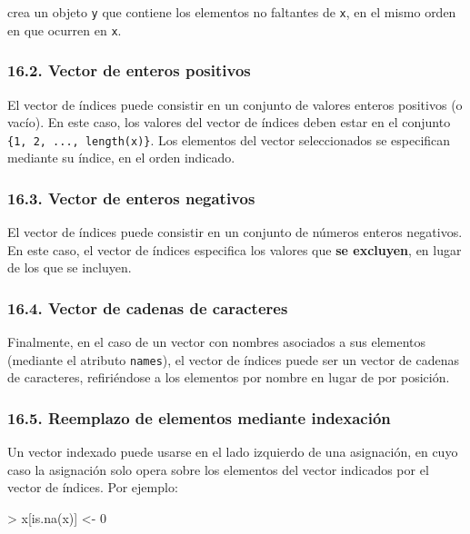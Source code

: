 \documentclass[
  jou,
  floatsintext,
  longtable,
  a4paper,
  nolmodern,
  notxfonts,
  notimes,
  12pt,
  colorlinks=true,linkcolor=blue,citecolor=blue,urlcolor=blue]{apa7}
\newenvironment{Shaded}{\begin{snugshade}}{\end{snugshade}}
\newcommand{\DecValTok}[1]{\textcolor[rgb]{0.68,0.00,0.00}{#1}}
\newcommand{\FunctionTok}[1]{\textcolor[rgb]{0.28,0.35,0.67}{#1}}
\newcommand{\NormalTok}[1]{\textcolor[rgb]{0.00,0.23,0.31}{#1}}
\newcommand{\OtherTok}[1]{\textcolor[rgb]{0.00,0.23,0.31}{#1}}
\newcommand{\SpecialCharTok}[1]{\textcolor[rgb]{0.37,0.37,0.37}{#1}}
\begin{document}
crea un objeto \texttt{y} que contiene los elementos no faltantes de
\texttt{x}, en el mismo orden en que ocurren en \texttt{x}.

\subsubsection{16.2. Vector de enteros
positivos}\label{vector-de-enteros-positivos}

El vector de índices puede consistir en un conjunto de valores enteros
positivos (o vacío). En este caso, los valores del vector de índices
deben estar en el conjunto \texttt{\{1,\ 2,\ ...,\ length(x)\}}. Los
elementos del vector seleccionados se especifican mediante su índice, en
el orden indicado.

\subsubsection{16.3. Vector de enteros
negativos}\label{vector-de-enteros-negativos}

El vector de índices puede consistir en un conjunto de números enteros
negativos. En este caso, el vector de índices especifica los valores que
\textbf{se excluyen}, en lugar de los que se incluyen.

\subsubsection{16.4. Vector de cadenas de
caracteres}\label{vector-de-cadenas-de-caracteres}

Finalmente, en el caso de un vector con nombres asociados a sus
elementos (mediante el atributo \texttt{names}), el vector de índices
puede ser un vector de cadenas de caracteres, refiriéndose a los
elementos por nombre en lugar de por posición.

\subsubsection{16.5. Reemplazo de elementos mediante
indexación}\label{reemplazo-de-elementos-mediante-indexaciuxf3n}

Un vector indexado puede usarse en el lado izquierdo de una asignación,
en cuyo caso la asignación solo opera sobre los elementos del vector
indicados por el vector de índices. Por ejemplo:

\begin{Shaded}
\begin{Highlighting}[]
\SpecialCharTok{\textgreater{}}\NormalTok{ x[}\FunctionTok{is.na}\NormalTok{(x)] }\OtherTok{\textless{}{-}} \DecValTok{0}
\end{Highlighting}
\end{Shaded}
\end{document}
